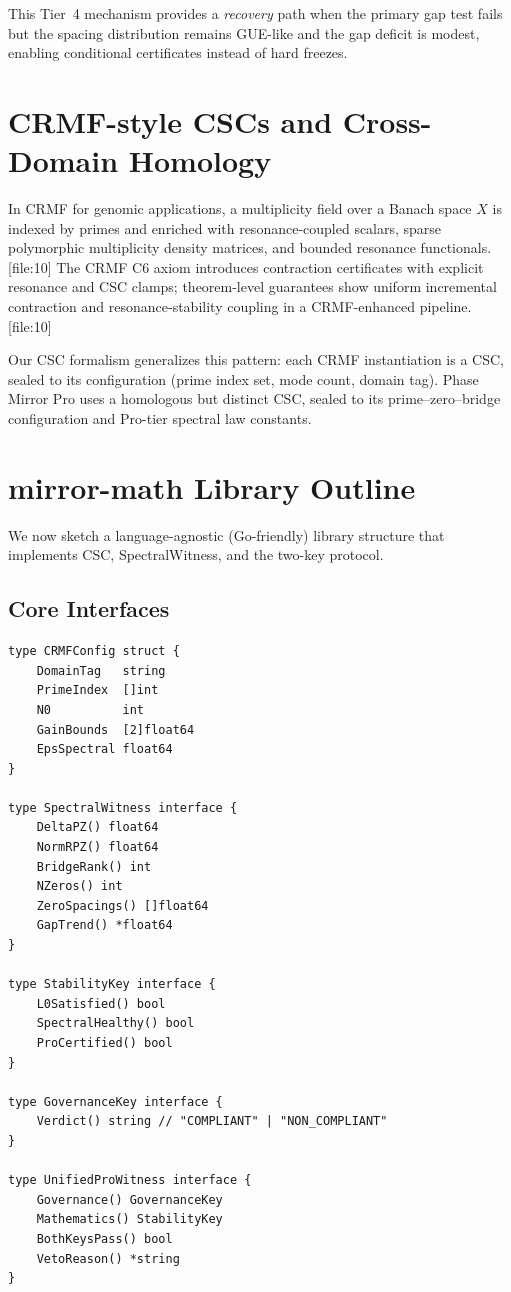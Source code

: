 \documentclass[11pt]{article}
\begin{document}
This Tier~4 mechanism provides a \emph{recovery} path when the primary
gap test fails but the spacing distribution remains GUE-like and the
gap deficit is modest, enabling conditional certificates instead of
hard freezes.

\section{CRMF-style CSCs and Cross-Domain Homology}

In CRMF for genomic applications, a multiplicity field over a Banach
space $X$ is indexed by primes and enriched with resonance-coupled
scalars, sparse polymorphic multiplicity density matrices, and bounded
resonance functionals.%
[file:10] The CRMF C6 axiom introduces contraction certificates with
explicit resonance and CSC clamps; theorem-level guarantees show
uniform incremental contraction and resonance-stability coupling in a
CRMF-enhanced pipeline.%
[file:10]

Our CSC formalism generalizes this pattern: each CRMF instantiation is a
CSC, sealed to its configuration (prime index set, mode count, domain
tag). Phase Mirror Pro uses a homologous but distinct CSC, sealed to
its prime--zero–bridge configuration and Pro-tier spectral law constants.

\section{mirror-math Library Outline}

We now sketch a language-agnostic (Go-friendly) library structure that
implements CSC, SpectralWitness, and the two-key protocol.

\subsection{Core Interfaces}

\begin{verbatim}
type CRMFConfig struct {
    DomainTag   string
    PrimeIndex  []int
    N0          int
    GainBounds  [2]float64
    EpsSpectral float64
}

type SpectralWitness interface {
    DeltaPZ() float64
    NormRPZ() float64
    BridgeRank() int
    NZeros() int
    ZeroSpacings() []float64
    GapTrend() *float64
}

type StabilityKey interface {
    L0Satisfied() bool
    SpectralHealthy() bool
    ProCertified() bool
}

type GovernanceKey interface {
    Verdict() string // "COMPLIANT" | "NON_COMPLIANT"
}

type UnifiedProWitness interface {
    Governance() GovernanceKey
    Mathematics() StabilityKey
    BothKeysPass() bool
    VetoReason() *string
}
\end{verbatim}
\end{document}
